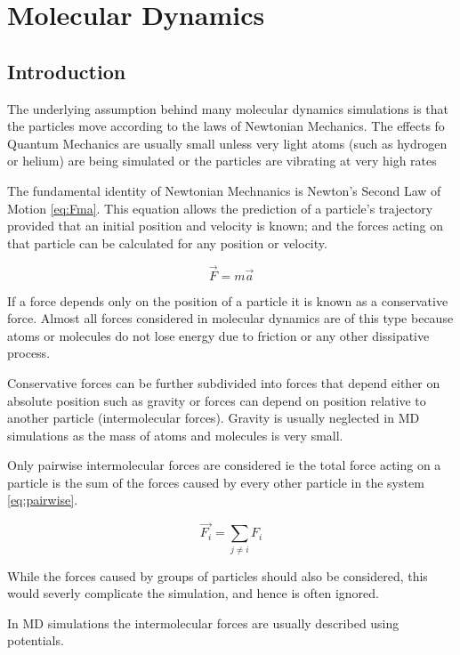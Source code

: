 \documentclass[12pt]{UoAthesis}
\begin{document}
\chapter{Molecular Dynamics}
\section{Introduction}
The underlying assumption behind many molecular dynamics simulations
is that the particles move according to the laws of Newtonian
Mechanics.  The effects fo Quantum Mechanics are usually small unless
very light atoms (such as hydrogen or helium) are being simulated or
the particles are vibrating at very high rates \cite{Frenkel2002}

The fundamental identity of Newtonian Mechnanics is Newton's Second
Law of Motion \eqref{eq:Fma}. This equation allows the prediction of a
particle's trajectory provided that an initial position and velocity
is known; and the forces acting on that particle can be calculated for
any position or velocity.

\begin{equation}
  \vec{F} = m \vec{a} \label{eq:Fma}
\end{equation}

If a force depends only on the position of a particle it is known as a
conservative force.  Almost all forces considered in molecular
dynamics are of this type because atoms or molecules do not lose
energy due to friction or any other dissipative process.  

Conservative forces can be further subdivided into forces that depend
either on absolute position such as gravity or forces can depend on
position relative to another particle (intermolecular forces).
Gravity is usually neglected in MD simulations as the mass of atoms
and molecules is very small.

Only pairwise intermolecular forces are considered ie the total force
acting on a particle is the sum of the forces caused by every other
particle in the system \eqref{eq:pairwise}.

\begin{equation}
  \vec{F_i} = \sum_{j \not= i}^{}F_{i} \label{eq:pairwise}
\end{equation}

While the forces caused by groups of particles should also be
considered, this would severly complicate the simulation, and hence is
often ignored.

In MD simulations the intermolecular forces are usually described
using potentials.
\end{document}
